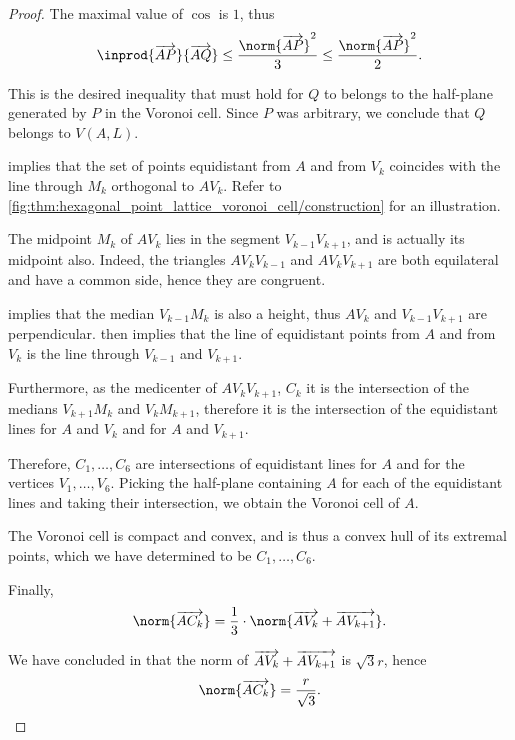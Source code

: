 \begin{proof}
  The maximal value of \( \cos \) is \( 1 \), thus
  \begin{equation*}
    \inprod {\vect{AP}} {\vect{AQ}} \leq \frac {\norm{\vect{AP}}^2} 3 \leq \frac {\norm{\vect{AP}}^2} 2.
  \end{equation*}

  This is the desired inequality that must hold for \( Q \) to belongs to the half-plane generated by \( P \) in the Voronoi cell. Since \( P \) was arbitrary, we conclude that \( Q \) belongs to \( V(A, L) \).

    implies that the set of points equidistant from \( A \) and from \( V_k \) coincides with the line through \( M_k \) orthogonal to \( A V_k \). Refer to \cref{fig:thm:hexagonal_point_lattice_voronoi_cell/construction} for an illustration.

  The midpoint \( M_k \) of \( A V_k \) lies in the segment \( V_{k-1} V_{k+1} \), and is actually its midpoint also. Indeed, the triangles \( A V_k V_{k-1} \) and \( A V_k V_{k+1} \) are both equilateral and have a common side, hence they are congruent.

   implies that the median \( V_{k-1} M_k \) is also a height, thus \( AV_k \) and \( V_{k-1} V_{k+1} \) are perpendicular.  then implies that the line of equidistant points from \( A \) and from \( V_k \) is the line through \( V_{k-1} \) and \( V_{k+1} \).

  Furthermore, as the medicenter of \( A V_k V_{k+1} \), \( C_k \) it is the intersection of the medians \( V_{k+1} M_k \) and \( V_k M_{k+1} \), therefore it is the intersection of the equidistant lines for \( A \) and \( V_k \) and for \( A \) and \( V_{k+1} \).

  Therefore, \( C_1, \ldots, C_6 \) are intersections of equidistant lines for \( A \) and for the vertices \( V_1, \ldots, V_6 \). Picking the half-plane containing \( A \) for each of the equidistant lines and taking their intersection, we obtain the Voronoi cell of \( A \).

  The Voronoi cell is compact and convex, and is thus a convex hull of its extremal points, which we have determined to be \( C_1, \ldots, C_6 \).

   Finally,
  \begin{equation*}
    \norm{\vect{AC_k}}
    =
    \frac 1 3 \cdot \norm{\vect{AV_k} + \vect{AV_{k+1}}}.
  \end{equation*}

  We have concluded in  that the norm of \( \overrightarrow{AV_k} + \overrightarrow{AV_{k+1}} \) is \( \sqrt 3 r \), hence
  \begin{equation*}
    \norm{\vect{AC_k}} = \frac r {\sqrt 3}.
  \end{equation*}
\end{proof}

